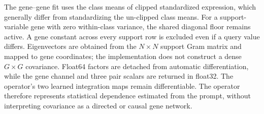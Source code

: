 The gene--gene fit uses the class means of clipped standardized expression, which generally differ from standardizing the un-clipped class means. For a support-variable gene with zero within-class variance, the shared diagonal floor remains active. A gene constant across every support row is excluded even if a query value differs. Eigenvectors are obtained from the $N\times N$ support Gram matrix and mapped to gene coordinates; the implementation does not construct a dense $G\times G$ covariance. Float64 factors are detached from automatic differentiation, while the gene channel and three pair scalars are returned in float32. The operator's two learned integration maps remain differentiable. The operator therefore represents statistical dependence estimated from the prompt, without interpreting covariance as a directed or causal gene network.


